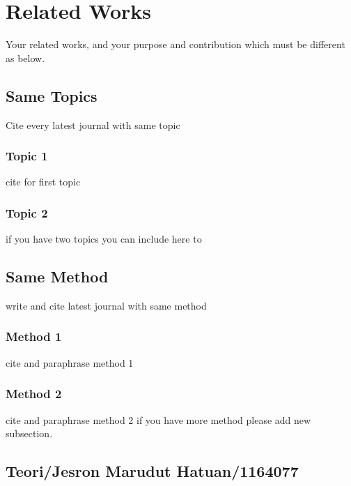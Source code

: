 \chapter{Related Works}

Your related works, and your purpose and contribution which must be different as below.

\section{Same Topics}
Cite every latest journal with same topic
\subsection{Topic 1}
cite for first topic

\subsection{Topic 2}
if you have two topics you can include here to


\section{Same Method}
write and cite latest journal with same method

\subsection{Method 1}
cite and paraphrase method 1

\subsection{Method 2}
cite and paraphrase method 2 if you have more method please add new subsection.

\section{Teori/Jesron Marudut Hatuan/1164077}
